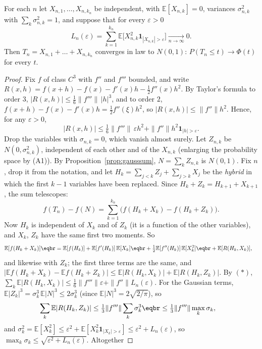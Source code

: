 \begin{theorem}[Lindeberg, 1922]\label{thm:lindeberg}
For each $n$ let $X_{n,1},\dots,X_{n,k_n}$ be independent, with $\mathbb E[X_{n,k}]=0$, variances $\sigma_{n,k}^2$ with $\sum_k\sigma_{n,k}^2=1$, and suppose that for every
$\varepsilon>0$
\[
L_n(\varepsilon)=\sum_{k=1}^{k_n}\mathbb E\bigl[X_{n,k}^2\mathbf 1_{|X_{n,k}|>\varepsilon}\bigr]\xrightarrow[n\to\infty]{}0.
\]
Then $T_n=X_{n,1}+\dots+X_{n,k_n}$ converges in law to $N(0,1)$: $P(T_n\le t)\to\Phi(t)$ for every $t$.
\end{theorem}
\begin{proof}
Fix $f$ of class $C^3$ with $f''$ and $f'''$ bounded, and write $R(x,h)=f(x+h)-f(x)-f'(x)h-\frac12f''(x)h^2$. By Taylor's formula to order $3$,
$|R(x,h)|\le\frac16\|f'''\|\,|h|^3$, and to order $2$, $f(x+h)-f(x)-f'(x)h=\frac12f''(\xi)h^2$, so $|R(x,h)|\le\|f''\|h^2$. Hence, for any $\varepsilon>0$,
\[
|R(x,h)|\le\tfrac16\|f'''\|\,\varepsilon h^2+\|f''\|h^2\mathbf 1_{|h|>\varepsilon}.\tag{$*$}
\]
Drop the variables with $\sigma_{n,k}=0$, which vanish almost surely. Let $Z_{n,k}$ be $N(0,\sigma_{n,k}^2)$, independent of each other and of the $X_{n,k}$
(enlarging the probability space by (A1)). By Proposition~\ref{prop:gausssum}, $N=\sum_kZ_{n,k}$ is $N(0,1)$. Fix $n$, drop it from the notation,
and let $H_k=\sum_{j<k}Z_j+\sum_{j>k}X_j$ be the \emph{hybrid} in which the first $k-1$ variables have been replaced. Since $H_k+Z_k=H_{k+1}+X_{k+1}$,
the sum telescopes:
\[
f(T_n)-f(N)=\sum_{k=1}^{k_n}\bigl(f(H_k+X_k)-f(H_k+Z_k)\bigr).
\]
Now $H_k$ is independent of $X_k$ and of $Z_k$ (it is a function of the other variables), and $X_k$, $Z_k$ have the same first two moments. So
\[
\begin{aligned}\mathbb E[f(H_k+X_k)]&\eqbr=\mathbb E[f(H_k)]+\mathbb E[f'(H_k)]\,\mathbb E[X_k]\eqbr+\tfrac12\mathbb E[f''(H_k)]\,\mathbb E[X_k^2]\eqbr+\mathbb E[R(H_k,X_k)],\end{aligned}
\]
and likewise with $Z_k$; the first three terms are the same, and $|\mathbb E f(H_k+X_k)-\mathbb E f(H_k+Z_k)|\le\mathbb E|R(H_k,X_k)|+\mathbb E|R(H_k,Z_k)|$. By $(*)$,
$\sum_k\mathbb E|R(H_k,X_k)|\le\frac16\|f'''\|\varepsilon+\|f''\|L_n(\varepsilon)$. For the Gaussian terms, $\mathbb E|Z_k|^3=\sigma_k^3\,\mathbb E|N|^3\le2\sigma_k^3$ (since $\mathbb E|N|^3=2\sqrt{2/\pi}$), so
\[
\begin{aligned}\sum_k\mathbb E|R(H_k,Z_k)|&\le\tfrac13\|f'''\|\sum_k\sigma_k^3\eqbr\le\tfrac13\|f'''\|\max_k\sigma_k,\end{aligned}
\]
and $\sigma_k^2=\mathbb E[X_k^2]\le\varepsilon^2+\mathbb E[X_k^2\mathbf 1_{|X_k|>\varepsilon}]\le\varepsilon^2+L_n(\varepsilon)$, so $\max_k\sigma_k\le\sqrt{\varepsilon^2+L_n(\varepsilon)}$. Altogether

\end{proof}
